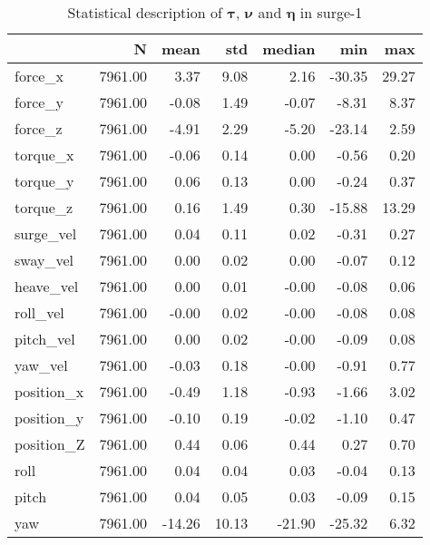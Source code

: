 \begin{table}[hb]
\centering
\caption{Statistical description of $\boldsymbol{\tau}$, $\boldsymbol{\nu}$ and $\boldsymbol{\eta}$ in surge-1}
\label{tab:description-surge-1}
\begin{tabular}{lrrrrrr}
\toprule
{} &       N &   mean &   std & median &    min &   max \\
\midrule
force\_x    & 7961.00 &   3.37 &  9.08 &   2.16 & -30.35 & 29.27 \\
force\_y    & 7961.00 &  -0.08 &  1.49 &  -0.07 &  -8.31 &  8.37 \\
force\_z    & 7961.00 &  -4.91 &  2.29 &  -5.20 & -23.14 &  2.59 \\
torque\_x   & 7961.00 &  -0.06 &  0.14 &   0.00 &  -0.56 &  0.20 \\
torque\_y   & 7961.00 &   0.06 &  0.13 &   0.00 &  -0.24 &  0.37 \\
torque\_z   & 7961.00 &   0.16 &  1.49 &   0.30 & -15.88 & 13.29 \\
surge\_vel  & 7961.00 &   0.04 &  0.11 &   0.02 &  -0.31 &  0.27 \\
sway\_vel   & 7961.00 &   0.00 &  0.02 &   0.00 &  -0.07 &  0.12 \\
heave\_vel  & 7961.00 &   0.00 &  0.01 &  -0.00 &  -0.08 &  0.06 \\
roll\_vel   & 7961.00 &  -0.00 &  0.02 &  -0.00 &  -0.08 &  0.08 \\
pitch\_vel  & 7961.00 &   0.00 &  0.02 &  -0.00 &  -0.09 &  0.08 \\
yaw\_vel    & 7961.00 &  -0.03 &  0.18 &  -0.00 &  -0.91 &  0.77 \\
position\_x & 7961.00 &  -0.49 &  1.18 &  -0.93 &  -1.66 &  3.02 \\
position\_y & 7961.00 &  -0.10 &  0.19 &  -0.02 &  -1.10 &  0.47 \\
position\_Z & 7961.00 &   0.44 &  0.06 &   0.44 &   0.27 &  0.70 \\
roll       & 7961.00 &   0.04 &  0.04 &   0.03 &  -0.04 &  0.13 \\
pitch      & 7961.00 &   0.04 &  0.05 &   0.03 &  -0.09 &  0.15 \\
yaw        & 7961.00 & -14.26 & 10.13 & -21.90 & -25.32 &  6.32 \\
\bottomrule
\end{tabular}
\end{table}

